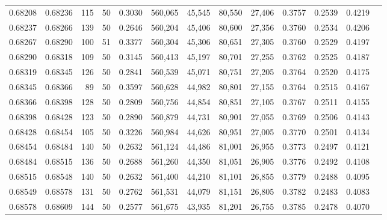 \begin{tabular}{rrrrrrrrrrrrr}
0.68208 & 0.68236 &   115 &  50 &                                     0.3030 & 560,065 &  45,545 &  80,550 &  27,406 & 0.3757 & 0.2539 & 0.4219 \\
0.68237 & 0.68266 &   139 &  50 &                                     0.2646 & 560,204 &  45,406 &  80,600 &  27,356 & 0.3760 & 0.2534 & 0.4206 \\
0.68267 & 0.68290 &   100 &  51 &                                     0.3377 & 560,304 &  45,306 &  80,651 &  27,305 & 0.3760 & 0.2529 & 0.4197 \\
0.68290 & 0.68318 &   109 &  50 &                                     0.3145 & 560,413 &  45,197 &  80,701 &  27,255 & 0.3762 & 0.2525 & 0.4187 \\
0.68319 & 0.68345 &   126 &  50 &                                     0.2841 & 560,539 &  45,071 &  80,751 &  27,205 & 0.3764 & 0.2520 & 0.4175 \\
0.68345 & 0.68366 &    89 &  50 &                                     0.3597 & 560,628 &  44,982 &  80,801 &  27,155 & 0.3764 & 0.2515 & 0.4167 \\
0.68366 & 0.68398 &   128 &  50 &                                     0.2809 & 560,756 &  44,854 &  80,851 &  27,105 & 0.3767 & 0.2511 & 0.4155 \\
0.68398 & 0.68428 &   123 &  50 &                                     0.2890 & 560,879 &  44,731 &  80,901 &  27,055 & 0.3769 & 0.2506 & 0.4143 \\
0.68428 & 0.68454 &   105 &  50 &                                     0.3226 & 560,984 &  44,626 &  80,951 &  27,005 & 0.3770 & 0.2501 & 0.4134 \\
0.68454 & 0.68484 &   140 &  50 &                                     0.2632 & 561,124 &  44,486 &  81,001 &  26,955 & 0.3773 & 0.2497 & 0.4121 \\
0.68484 & 0.68515 &   136 &  50 &                                     0.2688 & 561,260 &  44,350 &  81,051 &  26,905 & 0.3776 & 0.2492 & 0.4108 \\
0.68515 & 0.68548 &   140 &  50 &                                     0.2632 & 561,400 &  44,210 &  81,101 &  26,855 & 0.3779 & 0.2488 & 0.4095 \\
0.68549 & 0.68578 &   131 &  50 &                                     0.2762 & 561,531 &  44,079 &  81,151 &  26,805 & 0.3782 & 0.2483 & 0.4083 \\
0.68578 & 0.68609 &   144 &  50 &                                     0.2577 & 561,675 &  43,935 &  81,201 &  26,755 & 0.3785 & 0.2478 & 0.4070 \\

\end{tabular}
